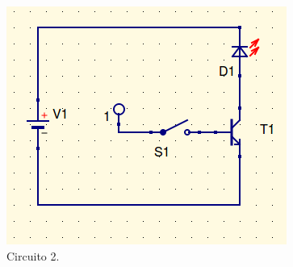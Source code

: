 \documentclass{article}
\begin{document}
\begin{itemize}
\begin{figure}[hptp]
    \centering
    \includegraphics[scale=0.35]{circuito1.png}
    \caption{Circuito 2.}
    \label{2}
\end{figure}
\smallskip

\end{itemize}

%
\end{document}
